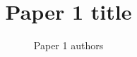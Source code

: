 \documentclass{article}
\title{Paper 1 title}
\author{Paper 1 authors}
\begin{document}
\newtoggle{thesis}
\togglefalse{thesis}

\maketitle

\end{document}
